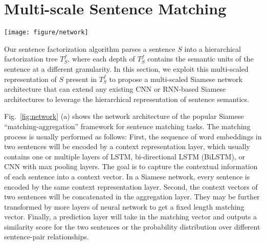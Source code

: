 \section{Multi-scale Sentence Matching}
\label{sec:multi-layer}


\begin{figure*}[!htb]
\centering
\texttt{[image: figure/network]}
\vspace{0mm}
\caption{Extend the Siamese network architecture for sentence matching by feeding into the multi-scale representations of sentence pairs.}
\label{fig:network}
\vspace{-2mm}
\end{figure*}


Our sentence factorization algorithm parses a sentence $S$ into a hierarchical factorization tree $T^f_S$, where each depth of $T^f_S$ contains the semantic units of the sentence at a different granularity.
In this section, we exploit this multi-scaled representation of $S$ present in $T^f_S$ to propose a multi-scaled Siamese network architecture that can extend any existing CNN or RNN-based Siamese architectures to leverage the hierarchical representation of sentence semantics.


Fig.~\ref{fig:network} (a) shows the network architecture of the popular Siamese ``matching-aggregation'' framework \cite{wang2016compare,mueller2016siamese,severyn2015learning,neculoiu2016learning,baudivs2016sentence} for sentence matching tasks. The matching process is usually performed as follows: First, the sequence of word embeddings in two sentences will be encoded by a context representation layer, which usually contains one or multiple layers of LSTM, bi-directional LSTM (BiLSTM), or CNN with max pooling layers.
The goal is to capture the contextual information of each sentence into a context vector. 
In a Siamese network, every sentence is encoded by the same context representation layer.
Second, the context vectors of two sentences will be concatenated in the aggregation layer. They may be further transformed by more layers of neural network
to get a fixed length matching vector.
Finally, a prediction layer will take in the matching vector and outputs a similarity score for the two sentences or the probability distribution over different sentence-pair relationships.


